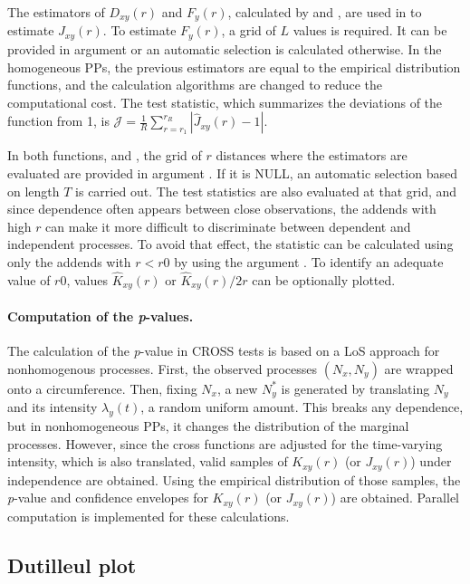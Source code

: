 The estimators of  $D_{xy}(r)$ and  $F_{y}(r)$, calculated by    and  , are  used  in    to estimate  $J_{xy}(r)$.  To estimate $F_{y}(r)$, a grid  of $L$ values is required. It can be provided in argument  or an automatic selection is calculated otherwise.	In the homogeneous PPs,  the  previous estimators  are equal to  the empirical  distribution functions,  and the  calculation algorithms are changed to reduce the computational cost. The test   statistic,  which  summarizes  the deviations  of the function from 1, is  
$\mathcal{J}=\frac{1}{R}\sum_{r=r_1}^{r_R}|\hat J_{xy}(r)-1|$.


In both functions,  and , the  grid of $r$ distances where the estimators are evaluated are  provided  in argument . If it is NULL, an automatic  selection  based on length $T$  is carried out.
The  test statistics are also evaluated at  that grid, and since	dependence   often appears between close observations,  the  addends  with high $r$   can make it more difficult to discriminate  between dependent and independent processes. To avoid that effect,  the statistic can be calculated using only the addends with  $r<r0$  by using the argument . To identify an adequate value of $r0$,  values $\hat K_{xy}(r)$ or $\hat K_{xy}(r)/2r$   can be optionally  plotted.   




\paragraph{Computation of the \emph{p}-values.}   The calculation of the \emph{p}-value in  CROSS  tests is based on a LoS approach  for nonhomogenous processes.  First, the  observed  processes $(N_x, N_y)$ are wrapped onto a circumference. Then, fixing $N_x$, a new $N^*_y$ is generated by translating $N_y$ and  its  intensity $\lambda_y(t)$,  a random   uniform amount. This breaks any dependence,  but in nonhomogeneous PPs,  it   changes the distribution of the marginal processes. However, since    the  cross functions are adjusted  for the time-varying intensity,  which is also translated,  valid samples of  $K_{xy}(r)$ (or $J_{xy}(r)$)   under  independence  are obtained. 
Using the empirical distribution of those samples,  the \emph{p}-value  and
 confidence  envelopes for  $K_{xy}(r)$ (or $J_{xy}(r)$) are obtained.  Parallel computation is implemented  for these calculations.

\subsection{Dutilleul plot} 
 
